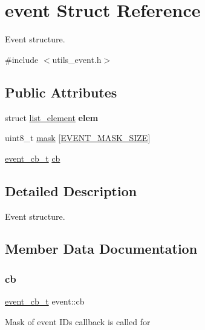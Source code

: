 \hypertarget{structevent}{}\section{event Struct Reference}
\label{structevent}


Event structure.  




{\ttfamily \#include $<$utils\+\_\+event.\+h$>$}

\subsection*{Public Attributes}
\begin{DoxyCompactItemize}
\item 
\mbox{\label{structevent_a63bde48c922403f20d4607f0cf207755}} 
struct \hyperlink{structlist__element}{list\+\_\+element} {\bfseries elem}
\item 
uint8\+\_\+t \hyperlink{structevent_a0424e81216afd94115c0c24198f106b4}{mask} \mbox{[}\hyperlink{utils__event_8h_a2af2644ca6887944b1e80857a8353170}{E\+V\+E\+N\+T\+\_\+\+M\+A\+S\+K\+\_\+\+S\+I\+ZE}\mbox{]}
\item 
\hyperlink{utils__event_8h_ababd195dca19ce9c6976c408d0dc5b2d}{event\+\_\+cb\+\_\+t} \hyperlink{structevent_a0dfaf0bb56fc7c24f2c7b23d08a0744e}{cb}
\end{DoxyCompactItemize}


\subsection{Detailed Description}
Event structure. 

\subsection{Member Data Documentation}
\mbox{\label{structevent_a0dfaf0bb56fc7c24f2c7b23d08a0744e}} 
\subsubsection{\texorpdfstring{cb}{cb}}
{\footnotesize\ttfamily \hyperlink{utils__event_8h_ababd195dca19ce9c6976c408d0dc5b2d}{event\+\_\+cb\+\_\+t} event\+::cb}

Mask of event I\+Ds callback is called for \mbox{\label{structevent_a0424e81216afd94115c0c24198f106b4}} 
